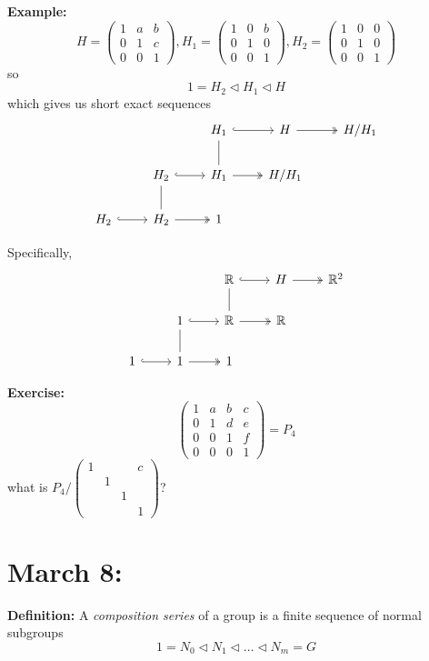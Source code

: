 \documentclass[12pt]{article}
\newcommand{\R}{\mathbb{R}}
\begin{document}
    \textbf{Example:} 
    \[H = \begin{pmatrix}
        1 & a & b\\ 
        0 & 1 & c\\
        0 & 0 & 1
    \end{pmatrix}, H_1 = \begin{pmatrix}
        1 & 0 & b\\ 
        0 & 1 & 0\\
        0 & 0 & 1
    \end{pmatrix}, H_2 = \begin{pmatrix}
        1 & 0 & 0\\ 
        0 & 1 & 0\\
        0 & 0 & 1
    \end{pmatrix}\]
    so 
    \[1 = H_2 \triangleleft H_1 \triangleleft H\]
    which gives us short exact sequences 
    \[\begin{tikzcd}
        & & H_1 \arrow[no head]{d} \arrow[hook]{r} & H \arrow[two heads]{r} & H/H_1\\
        & H_2 \arrow[hook]{r} \arrow[no head]{d} & H_1 \arrow[two heads]{r} & H/H_1\\
        H_2 \arrow[hook]{r} & H_2 \arrow[two heads]{r} & 1
    \end{tikzcd}\]

    Specifically, 
    \[\begin{tikzcd}
        & & \R \arrow[no head]{d} \arrow[hook]{r} & H \arrow[two heads]{r} & \R^2\\
        & 1 \arrow[hook]{r} \arrow[no head]{d} & \R \arrow[two heads]{r} & \R\\
        1 \arrow[hook]{r} & 1 \arrow[two heads]{r} & 1
    \end{tikzcd}\]

    \textbf{Exercise:} 
    \[\begin{pmatrix}
        1 & a & b & c\\ 
        0 & 1 & d & e\\ 
        0 & 0 & 1 & f\\
        0 & 0 & 0 & 1
    \end{pmatrix} = P_4\] 
    what is $P_4/\begin{pmatrix}
        1 & & & c\\ 
        & 1\\ 
        & & 1\\ 
        & & & 1
    \end{pmatrix}$?

\section{March 8:}
    \textbf{Definition:} A \emph{composition series} of a group is a finite sequence of normal subgroups 
    \[1 = N_0 \triangleleft N_1 \triangleleft \dots \triangleleft N_m = G\]
\end{document}
